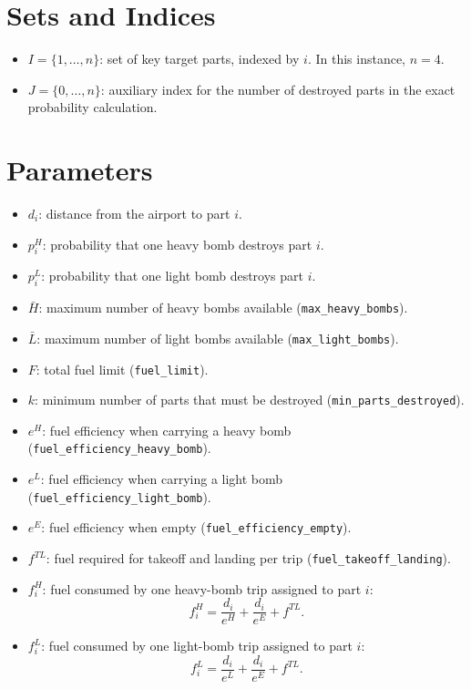 \section*{Sets and Indices}

\begin{itemize}
    \item $I=\{1,\dots,n\}$: set of key target parts, indexed by $i$. In this instance, $n=4$.
    \item $J=\{0,\dots,n\}$: auxiliary index for the number of destroyed parts in the exact probability calculation.
\end{itemize}

\section*{Parameters}

\begin{itemize}
    \item $d_i$: distance from the airport to part $i$.
    \item $p_i^H$: probability that one heavy bomb destroys part $i$.
    \item $p_i^L$: probability that one light bomb destroys part $i$.
    \item $\bar H$: maximum number of heavy bombs available (\texttt{max\_heavy\_bombs}).
    \item $\bar L$: maximum number of light bombs available (\texttt{max\_light\_bombs}).
    \item $F$: total fuel limit (\texttt{fuel\_limit}).
    \item $k$: minimum number of parts that must be destroyed (\texttt{min\_parts\_destroyed}).
    \item $e^H$: fuel efficiency when carrying a heavy bomb (\texttt{fuel\_efficiency\_heavy\_bomb}).
    \item $e^L$: fuel efficiency when carrying a light bomb (\texttt{fuel\_efficiency\_light\_bomb}).
    \item $e^E$: fuel efficiency when empty (\texttt{fuel\_efficiency\_empty}).
    \item $f^{TL}$: fuel required for takeoff and landing per trip (\texttt{fuel\_takeoff\_landing}).
    \item $f_i^H$: fuel consumed by one heavy-bomb trip assigned to part $i$:
    \[
    f_i^H=\frac{d_i}{e^H}+\frac{d_i}{e^E}+f^{TL}.
    \]
    \item $f_i^L$: fuel consumed by one light-bomb trip assigned to part $i$:
    \[
    f_i^L=\frac{d_i}{e^L}+\frac{d_i}{e^E}+f^{TL}.
    \]
\end{itemize}


